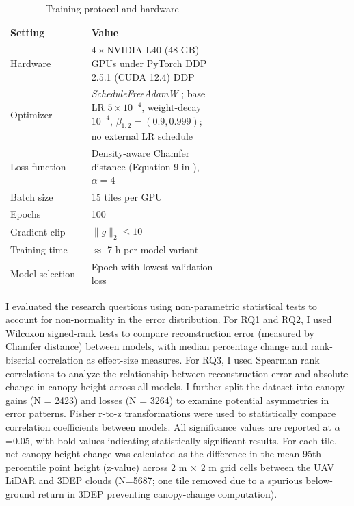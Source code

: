 \documentclass[12pt]{report}
\begin{document}
\begin{table}[htbp]
  \centering
  \caption{Training protocol and hardware}
  \label{tab:training_protocol}
  \begin{tabular}{lp{0.62\linewidth}}
    \toprule
    \textbf{Setting} & \textbf{Value} \\
    \midrule
    Hardware      & 4\,×\,NVIDIA L40 (48 GB) GPUs under PyTorch DDP 2.5.1 (CUDA 12.4)
 DDP \\
    Optimizer     & \textit{ScheduleFreeAdamW} \citep{defazio_road_2024}; base LR $5\times10^{-4}$, weight-decay $10^{-4}$, $\beta_{1,2}=(0.9,0.999)$; no external LR schedule \\
    Loss function & Density-aware Chamfer distance (Equation 9 in \citep{wu_density-aware_2021}), $\alpha=4$ \\
    Batch size    & 15 tiles per GPU \\
    Epochs        & 100 \\
    Gradient clip & $\lVert g\rVert_2 \le 10$ \\
    Training time & $\approx$ 7 h per model variant \\
    Model selection & Epoch with lowest validation loss \\
    \bottomrule
  \end{tabular}
\end{table}

\vspace{-3pt}

I evaluated the research questions using non-parametric statistical tests to account for non-normality in the error distribution. For RQ1 and RQ2, I used Wilcoxon signed-rank tests to compare reconstruction error (measured by Chamfer distance) between models, with median percentage change and rank-biserial correlation as effect-size measures. For RQ3, I used Spearman rank correlations to analyze the relationship between reconstruction error and absolute change in canopy height across all models. I further split the dataset into canopy gains (N = 2423) and losses (N = 3264) to examine potential asymmetries in error patterns. Fisher r-to-z transformations were used to statistically compare correlation coefficients between models. All significance values are reported at $\alpha$=0.05, with bold values indicating statistically significant results.
For each tile, net canopy height change was calculated as the difference in the mean 95th percentile point height (z-value) across 2 m × 2 m grid cells between the UAV LiDAR and 3DEP clouds (N=5687; one tile removed due to a spurious below-ground return in 3DEP preventing canopy-change computation).
\end{document}
